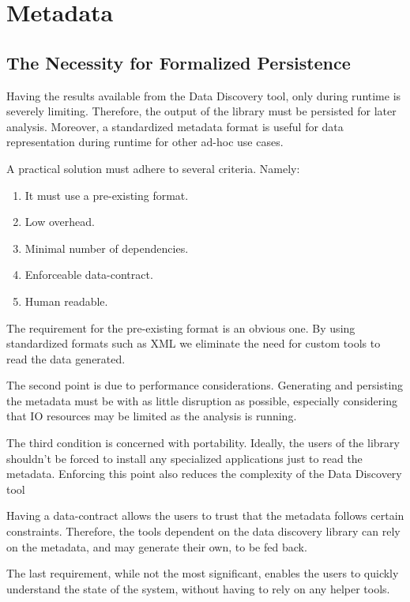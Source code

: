 \section{Metadata}

\subsection{The Necessity for Formalized Persistence}

Having the results available from the Data Discovery tool, only during runtime is severely limiting.
Therefore, the output of the library must be persisted for later analysis.
Moreover, a standardized
metadata format is useful for data representation during runtime for other ad-hoc use cases.
\newline

A practical solution must adhere to several criteria.
Namely:
\begin{enumerate}
    \item It must use a pre-existing format.
    \item Low overhead.
    \item Minimal number of dependencies.
    \item Enforceable data-contract.
    \item Human readable.
\end{enumerate}

The requirement for the pre-existing format is an obvious one.
By using standardized formats such as XML we eliminate the need for custom tools to read the
data generated.

The second point is due to performance considerations. Generating and persisting the metadata must be
with as little disruption as possible, especially considering that IO resources may be limited as the
analysis is running.

The third condition is concerned with portability.
Ideally, the users of the library shouldn't be
forced to install any specialized applications just to read the metadata.
Enforcing this point also reduces the complexity of the Data Discovery tool

Having a data-contract allows the users to trust that the metadata follows certain constraints.
Therefore, the tools dependent on the data discovery library can rely on the metadata, and may generate their own,
to be fed back.

The last requirement, while not the most significant, enables the users to quickly understand the
state of the system, without having to rely on any helper tools.

